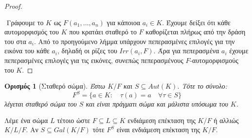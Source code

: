 \documentclass[oneside,a4paper]{article}
\newtheorem*{defn}{Ορισμός}
\begin{document}
\begin{proof} $ $
	
	$ $\newline
	Γράφουμε το $K$ ως $F(a_1 , \ldots, a_n)$ για κάποιοα $a_i \in K$. Έχουμε δείξει ότι κάθε αυτομορφισμός του $K$ που κρατάει σταθερό το $F$ καθορίζεται πλήρως από την δράση του στα $a_i$. Από το προηγούμενο λήμμα υπάρχουν πεπερασμένες επιλογές για την εικόνα του κάθε $a_i$, δηλαδή οι ρίζες του $Irr(a_i, F)$. Άρα για πεπερασμένα $a_i$ έχουμε πεπερασμένες επιλογές για τις εικόνες, συνεπώς πεπερασμένους $F$-αυτομορφισμούς του $K$.
\end{proof}

\begin{defn}[Σταθερό σώμα]
	Έστω $K/F$ και $S \subseteq Aut(K)$. Τότε το σύνολο:
	$$F^S = \{a \in K: \quad \tau(a) = a \quad\forall \tau \in S\}$$
	λέγεται σταθερό σώμα του $S$ και είναι πράγματι σώμα και μάλιστα υπόσωμα του $K$.
\end{defn}

Λέμε ένα σώμα $L$ τέτοιο ώστε $F \subseteq L \subseteq K$ ενδιάμεση επέκταση της $K/F$ ή αλλιώς $K/L/F$. Αν $S\subseteq Gal(K/F)$ τότε $F^S$ είναι ενδιάμεση επέκταση της $K/F$.
\end{document}

